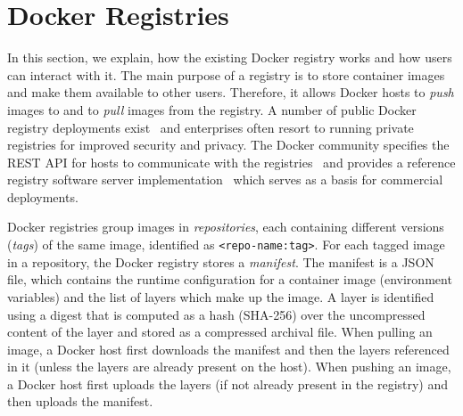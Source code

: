 \section{Docker Registries}
\label{sec:background}


%
%

In this section, we explain, how the existing Docker registry works and how users
can interact with it.
%
The main purpose of a registry is to store container images and make them available
to other users.
%
Therefore, it allows Docker hosts to \emph{push} images to and to \emph{pull}
images from the registry.
%
A number of public Docker registry deployments
exist~\cite{docker-hub,amazon-ecr,jfrog-artifactory,azure-cr,google-cr} and
enterprises often resort to running private registries for improved security
and privacy.
%
The Docker community specifies the REST API for hosts to communicate with the
registries~\cite{docker-registry-api} and provides a reference registry
software server implementation~\cite{docker-registry-software} which serves as
a basis for commercial deployments.





Docker registries group images in \emph{repositories}, each containing
different versions (\emph{tags}) of the same image, identified as
\texttt{<repo-name:tag>}.
%
For each tagged image in a repository, the Docker registry stores a \emph{manifest}.
%
The manifest is a JSON file, which contains the runtime configuration for a
container image (\eg environment variables) and the list of layers which make
up the image.
%
A layer is identified using a digest that is computed as a hash (SHA-256) over
the uncompressed content of the layer and stored as a compressed archival file.
%
When pulling an image, a Docker host first downloads the manifest and then the
layers referenced in it (unless the layers are already present on the host).
%
When pushing an image, a Docker host first uploads the layers (if not already present in
the registry) and then uploads the manifest.





